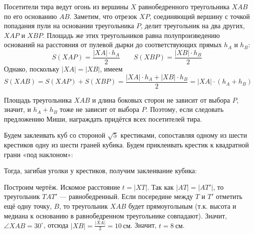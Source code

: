 % 

\begin{itemize}
\itA Посетители тира ведут огонь из вершины $X$ равнобедренного треугольника $XAB$ по его основанию
$AB$. Заметим, что отрезок $XP$, соединяющий вершину с точкой попадания пули на основании 
треугольника $P$,
делит треугольник на два других, $XAP$ и $XBP$. Площадь же этих треугольников равна полупроизведению 
оснований на расстояния от пулевой дырки до соответствующих прямых $h_A$ и $h_B$: 
$$S(XAP) = \frac{|XA|\cdot h_A}{2}\quad\quad
S(XBP) = \frac{|XB|\cdot h_B}{2}$$ 
Однако, поскольку $|XA|=|XB|$, имеем
$$S(XAB) = S(XAP) + S(XBP) = \frac{|XA|\cdot h_A + |XB|\cdot h_B}{2} = |XA|\cdot (h_A + h_B)$$

Площадь треугольника $XAB$ и длина боковых сторон не зависит от выбора $P$, значит, и $h_A + h_B$
тоже не зависит от выбора $P$. Поэтому, если следовать предложению Миши, награждать придётся
всех посетителей тира.

\itB Будем заклеивать куб со стороной $\sqrt 5$ крестиками, сопоставляя одному из шести крестиков 
одну из шести граней кубика. Будем приклеивать крестик к квадратной грани «под наклоном»:

\begin{center}
\end{center}

Тогда, загибая уголки у крестиков, получим заклеивание кубика:

\begin{center}
\end{center}

\itC Построим чертёж. Искомое расстояние $t = |XT|$. Так как $|AT| = |AT'|$, то треугольник $TAT'$ --- 
равнобедренный. Если посередине между $T$ и $T'$ отметить ещё одну точку,
$B$, то треугольник $XAB$ будет прямоугольным (т.к. высота и медиана к основанию в равнобедренном треугольнике 
совпадают). Значит, $\angle XAB = 30^\circ$, отсюда $|XB| = \frac{|XA|}{2} = \SI{10}{\text{см}}$.
Значит, $t = \SI{8}{\textrm{см}}$.


\end{itemize}
